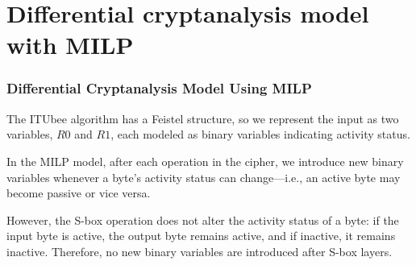 \documentclass{beamer}
\begin{document}
\section{Differential cryptanalysis model with MILP}

\begin{frame}
\frametitle{Differential Cryptanalysis Model Using MILP}

The ITUbee algorithm has a Feistel structure, so we represent the input as two variables, \( R0 \) and \( R1 \), each modeled as binary variables indicating activity status. 

In the MILP model, after each operation in the cipher, we introduce new binary variables whenever a byte’s activity status can change—i.e., an active byte may become passive or vice versa. 

However, the S-box operation does not alter the activity status of a byte: if the input byte is active, the output byte remains active, and if inactive, it remains inactive. Therefore, no new binary variables are introduced after S-box layers.

\end{frame}
\end{document}
